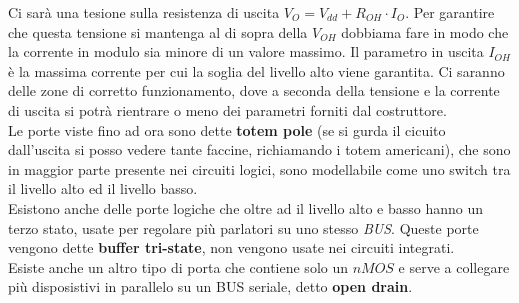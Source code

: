 \documentclass[12pt]{article}
\begin{document}
Ci sar\`a una tesione sulla resistenza di uscita $V_O = V_{dd} + R_{OH}\cdot I_O$. Per garantire che questa tensione si mantenga al di sopra della $V_{OH}$ dobbiama fare in modo che la corrente in modulo sia minore di un valore massimo. Il parametro in uscita $I_{OH}$ \`e la massima corrente per cui la soglia del livello alto viene garantita. Ci saranno delle zone di corretto funzionamento, dove a seconda della tensione e la corrente di uscita si potr\`a rientrare o meno dei parametri forniti dal costruttore. \\
Le porte viste fino ad ora sono dette \textbf{totem pole} (se si gurda il cicuito dall'uscita si posso vedere tante faccine, richiamando i totem americani), che sono in maggior parte presente nei circuiti logici, sono modellabile come uno switch tra il livello alto ed il livello basso. \\
Esistono anche delle porte logiche che oltre ad il livello alto e basso hanno un terzo stato, usate per regolare pi\`u parlatori su uno stesso \emph{BUS}. Queste porte vengono dette \textbf{buffer tri-state}, non vengono usate nei circuiti integrati. \\
Esiste anche un altro tipo di porta che contiene solo un $nMOS$ e serve a collegare pi\`u disposistivi in parallelo su un BUS seriale, detto \textbf{open drain}.
\end{document}
